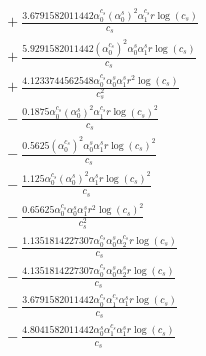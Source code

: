 \documentclass[10pt]{article}
\begin{document}
\begin{align*}
&{}  + \frac{3.6791582011442 \alpha_{0}^{c_s} \left(\alpha_{0}^s\right)^{2} \alpha_{1}^{c_s} r \log{\left(c_{s} \right)}}{c_{s}} \\
&{}  + \frac{5.9291582011442 \left(\alpha_{0}^{c_s}\right)^{2} \alpha_{0}^s \alpha_{1}^s r \log{\left(c_{s} \right)}}{c_{s}} \\
&{}  + \frac{4.1233744562548 \alpha_{0}^{c_s} \alpha_{0}^s \alpha_{1}^s r^{2} \log{\left(c_{s} \right)}}{c_{s}^{2}} \\
&{}  - \frac{0.1875 \alpha_{0}^{c_s} \left(\alpha_{0}^s\right)^{2} \alpha_{1}^{c_s} r \log{\left(c_{s} \right)}^{2}}{c_{s}} \\
&{}  - \frac{0.5625 \left(\alpha_{0}^{c_s}\right)^{2} \alpha_{0}^s \alpha_{1}^s r \log{\left(c_{s} \right)}^{2}}{c_{s}} \\
&{}  - \frac{1.125 \alpha_{0}^{c_s} \left(\alpha_{0}^s\right)^{2} \alpha_{1}^s r \log{\left(c_{s} \right)}^{2}}{c_{s}} \\
&{}  - \frac{0.65625 \alpha_{0}^{c_s} \alpha_{0}^s \alpha_{1}^s r^{2} \log{\left(c_{s} \right)}^{2}}{c_{s}^{2}} \\
&{}  - \frac{1.1351814227307 \alpha_{0}^{c_s} \alpha_{0}^s \alpha_{2}^{c_s} r \log{\left(c_{s} \right)}}{c_{s}} \\
&{}  - \frac{4.1351814227307 \alpha_{0}^{c_s} \alpha_{0}^s \alpha_{2}^s r \log{\left(c_{s} \right)}}{c_{s}} \\
&{}  - \frac{3.6791582011442 \alpha_{0}^{c_s} \alpha_{1}^{c_s} \alpha_{1}^s r \log{\left(c_{s} \right)}}{c_{s}} \\
&{}  - \frac{4.8041582011442 \alpha_{0}^s \alpha_{1}^{c_s} \alpha_{1}^s r \log{\left(c_{s} \right)}}{c_{s}}
\end{align*}
\end{document}
